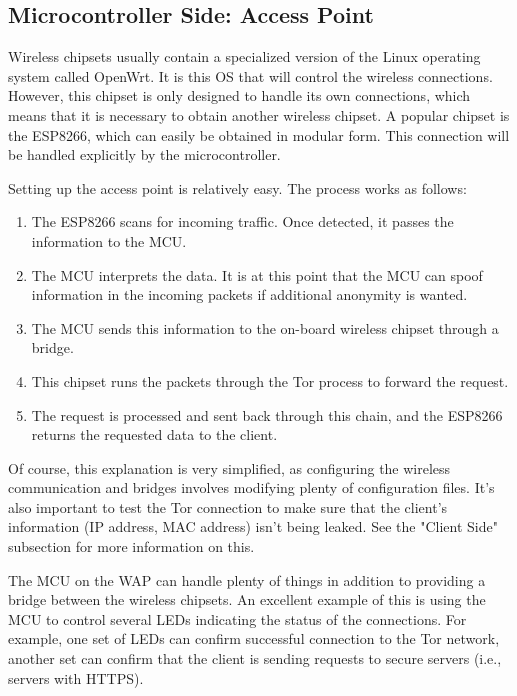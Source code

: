 \documentclass{article}
\begin{document}
\subsection*{Microcontroller Side: Access Point}

Wireless chipsets usually contain a specialized version of the Linux operating system called OpenWrt. It is this OS that will control the wireless connections. However, this chipset is only designed to handle its own connections, which means that it is necessary to obtain another wireless chipset. A popular chipset is the ESP8266, which can easily be obtained in modular form. This connection will be handled explicitly by the microcontroller.

Setting up the access point is relatively easy. The process works as follows:

\begin{enumerate}
\item The ESP8266 scans for incoming traffic. Once detected, it passes the information to the MCU.
\item The MCU interprets the data. It is at this point that the MCU can spoof information in the incoming packets if additional anonymity is wanted.
\item The MCU sends this information to the on-board wireless chipset through a bridge.
\item This chipset runs the packets through the Tor process to forward the request.
\item The request is processed and sent back through this chain, and the ESP8266 returns the requested data to the client.
\end{enumerate}

Of course, this explanation is very simplified, as configuring the wireless communication and bridges involves modifying plenty of configuration files. It's also important to test the Tor connection to make sure that the client's information (IP address, MAC address) isn't being leaked. See the "Client Side" subsection for more information on this.

The MCU on the WAP can handle plenty of things in addition to providing a bridge between the wireless chipsets. An excellent example of this is using the MCU to control several LEDs indicating the status of the connections. For example, one set of LEDs can confirm successful connection to the Tor network, another set can confirm that the client is sending requests to secure servers (i.e., servers with HTTPS).
\end{document}
